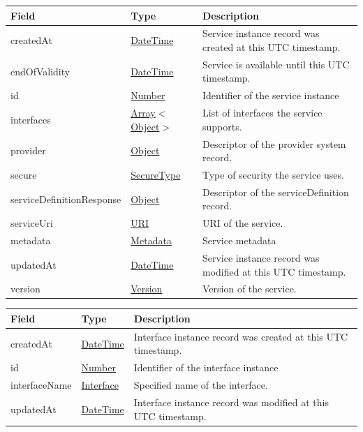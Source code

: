 \documentclass[a4paper]{arrowhead}
\newcommand{\pref}[1]{{\textcolor{ArrowheadGrey}{\hyperref[sec:model:primitives:#1]{#1}}}}
\begin{document}

\begin{table}[ht!]
\begin{tabularx}{\textwidth}{| p{4.25cm} | p{3.5cm} | X |} \hline
\rowcolor{gray!33} Field & Type      & Description \\ \hline
createdAt & \pref{DateTime} & Service instance record was created at this UTC timestamp. \\ \hline
endOfValidity & \pref{DateTime} & Service is available until this UTC timestamp. \\ \hline
id & \pref{Number} & Identifier of the service instance \\ \hline
interfaces & \pref{Array}$<$\pref{Object}$>$     & List of interfaces the service supports. \\ \hline
provider & \pref{Object} & Descriptor of the provider system record. \\ \hline
secure &\pref{SecureType}  & Type of security the service uses. \\ \hline
serviceDefinitionResponse & \pref{Object} & Descriptor of the serviceDefinition record. \\ \hline
serviceUri &\pref{URI}         & URI of the service. \\ \hline
metadata & \pref{Metadata}     & Service metadata \\ \hline
updatedAt & \pref{DateTime} & Service instance record was modified at this UTC timestamp. \\ \hline
version &\pref{Version}     & Version of the service. \\ \hline
\end{tabularx}
\end{table}


\begin{table}[ht!]
\begin{tabularx}{\textwidth}{| p{4.25cm} | p{3.5cm} | X |} \hline
\rowcolor{gray!33} Field & Type      & Description \\ \hline
createdAt & \pref{DateTime} & Interface instance record was created at this UTC timestamp. \\ \hline
id & \pref{Number} & Identifier of the interface instance \\ \hline
interfaceName &\pref{Interface}  & Specified name of the interface. \\ \hline
updatedAt & \pref{DateTime} & Interface instance record was modified at this UTC timestamp. \\ \hline
\end{tabularx}
\end{table}
\end{document}
